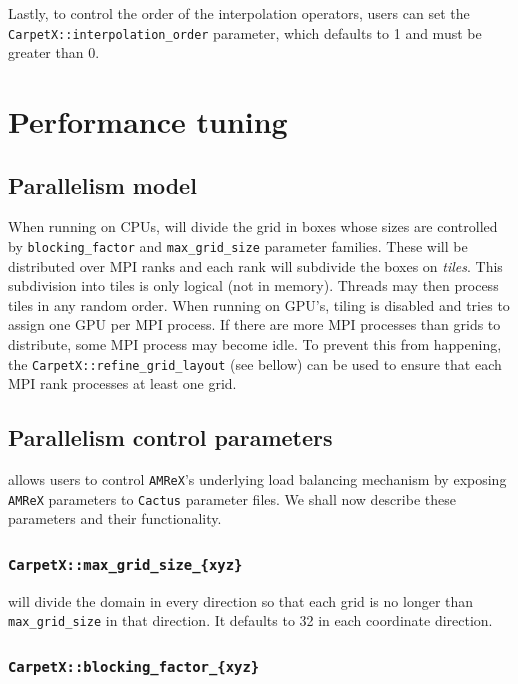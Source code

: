 Lastly, to control the order of the interpolation operators, users can set the \texttt{CarpetX::interpolation\_order} parameter, which defaults to 1 and must be greater than 0.

\section{Performance tuning}
\label{sec:perf_tuning}

\subsection{Parallelism model}

When running on CPUs, \AMReX\space will divide the grid in boxes whose sizes are controlled by \texttt{blocking\_factor} and \texttt{max\_grid\_size} parameter families. These will be distributed over MPI ranks and each rank will subdivide the boxes on \textit{tiles}. This subdivision into tiles is only logical (not in memory). Threads may then process tiles in any random order. When running on GPU's, tiling is disabled and \AMReX\space tries to assign one GPU per MPI process. If there are more MPI processes than grids to distribute, some MPI process may become idle. To prevent this from happening, the \texttt{CarpetX::refine\_grid\_layout} (see bellow) can be used to ensure that each MPI rank processes at least one grid.

\subsection{Parallelism control parameters}

\CarpetX\space allows users to control \texttt{AMReX}'s underlying load balancing mechanism by exposing \texttt{AMReX} parameters to \texttt{Cactus} parameter files. We shall now describe these parameters and their functionality.

\subsubsection{\texttt{CarpetX::max\_grid\_size\_\{xyz\}}}

\AMReX\space will divide the domain in every direction so that each grid is no longer than \texttt{max\_grid\_size} in that direction. It defaults to 32 in each coordinate direction.

\subsubsection{\texttt{CarpetX::blocking\_factor\_\{xyz\}}}

